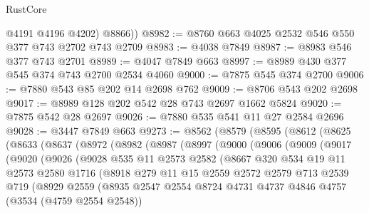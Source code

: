 \begin{lexlean}{RustCore}
\begin{coremodule}
          @4191
          @4196
          @4202)
        @8866))
@8982 := @8760 @663 @4025 @2532 @546 @550 @377 @743 @2702 @743 @2709
@8983 := @4038 @7849
@8987 := @8983 @546 @377 @743 @2701
@8989 := @4047 @7849 @663
@8997 := @8989 @430 @377 @545 @374 @743 @2700 @2534 @4060
@9000 := @7875 @545 @374 @2700
@9006 := @7880 @543 @85 @202 @14 @2698 @762
@9009 := @8706 @543 @202 @2698
@9017 := @8989 @128 @202 @542 @28 @743 @2697 @1662 @5824
@9020 := @7875 @542 @28 @2697
@9026 := @7880 @535 @541 @11 @27 @2584 @2696
@9028 := @3447 @7849 @663
@9273 := @8562
    (@8579
      (@8595
        (@8612
          (@8625
            (@8633
              (@8637
                (@8972
                  (@8982
                    (@8987
                      (@8997
                        (@9000
                          (@9006
                            (@9009
                              (@9017
                                (@9020
                                  (@9026
                                    (@9028
                                      @535
                                      @11
                                      @2573
                                      @2582
                                      (@8667
                                        @320
                                        @534
                                        @19
                                        @11
                                        @2573
                                        @2580
                                        @1716
                                        (@8918
                                          @279
                                          @11
                                          @15
                                          @2559
                                          @2572
                                          @2579
                                          @713
                                          @2539
                                          @719
                                          (@8929
                                            @2559
                                            (@8935
                                              @2547
                                              @2554
                                              @8724
                                              @4731
                                              @4737
                                              @4846
                                              @4757
                                              (@3534 (@4759 @2554 @2548))

\end{coremodule}
\end{lexlean}

